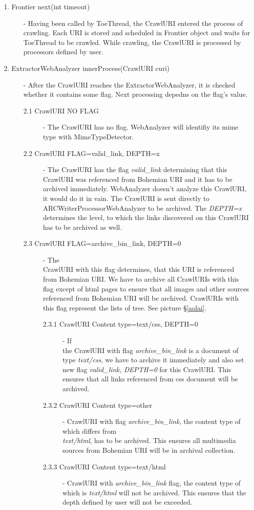 \documentclass[11pt,a4paper]{article}
\begin{document}
\begin{description}
\item[1. Frontier next(int timeout)] - Having been called by ToeThread, the CrawlURI entered the process of crawling. Each URI is stored and scheduled in Frontier object and waits for ToeThread to be crawled. While crawling, the CrawlURI is processed by processors defined by user.
\item[2. ExtractorWebAnalyzer innerProcess(CrawlURI curi)] - After the CrawlURI reaches the ExtractorWebAnalyzer, it is checked whether it contains some flag. Next processing depedns on the flag's value.

\begin{description}
\item[2.1 CrawlURI NO FLAG] - The CrawlURI has no flag. WebAnalyzer will identifiy its mime type with MimeTypeDetector.
\item[2.2 CrawlURI FLAG=valid\_link, DEPTH=x] - The CrawlURI has the flag \emph{valid\_link} determining that this CrawlURI was re\-fe\-ren\-ced from Bohemian URI and it has to be archived immediately. WebAnalyzer doesn't analyze this CrawlURI, it would do it in vain. The CrawlURI is sent directly to ARCWriterProcessorWebAnalyzer to be archived. The \emph{DEPTH=x} determines the level, to which the links discovered on this CrawlURI has to be archived as well.
\item[2.3 CrawlURI FLAG=archive\_bin\_link, DEPTH=0] - The \\CrawlURI with this flag determines, that this URI is referenced from Bohemian URI. We have to archive all CrawlURIs with this flag except of html pages to ensure that all images and other sources referenced from Bohemian URI will be archived. Crawl\-URI\-s with this flag represent the lists of tree. See picture \S\ref{aolai}.

\begin{description}
\item[2.3.1 CrawlURI Content type=text/css, DEPTH=0] - If \\the CrawlURI with flag \emph{archive\_bin\_link} is a document of type \emph{text/css}, we have to archive it immediately and also set new flag \emph{valid\_link, DEPTH=0} for this CrawlURI. This ensures that all links referenced from css document will be archived. 
\item[2.3.2 CrawlURI Content type=other] - CrawlURI with flag \emph{archive\_bin\_link}, the content type of which differs from \\ \emph{text/html}, has to be archived. This ensures all multimedia sources from Bohemian URI will be in archival collection.
\item[2.3.3 CrawlURI Content type=text/html] - CrawlURI with \emph{archive\_bin\_link} flag, the content type of which is \emph{text/html} will not be archived. This ensures that the depth defined by user will not be exceeded.
\end{description}
\end{description}



\end{description}
\end{document}
